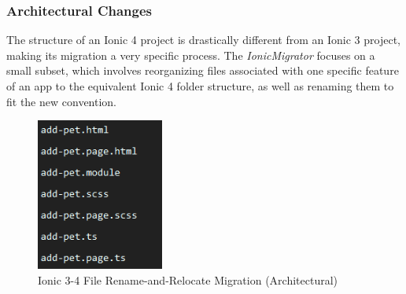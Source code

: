 \documentclass[conference]{IEEEtran}
\begin{document}
\subsubsection{Architectural Changes}
The structure of an Ionic 4 project is drastically different from an Ionic 3 project,
making its migration a very specific process. The \textit{IonicMigrator} focuses on a small subset, which
involves reorganizing files associated with one specific feature of an app to the equivalent Ionic 4
folder structure, as well as renaming them to fit the new convention.
\begin{figure}[!htb]
    \centering
    \includegraphics[width=0.8\linewidth,height=5cm,keepaspectratio]{files.PNG}
    \caption{Ionic 3-4 File Rename-and-Relocate Migration (Architectural)}
    \label{fig:ionicFileMigration}
\end{figure}
\end{document}

